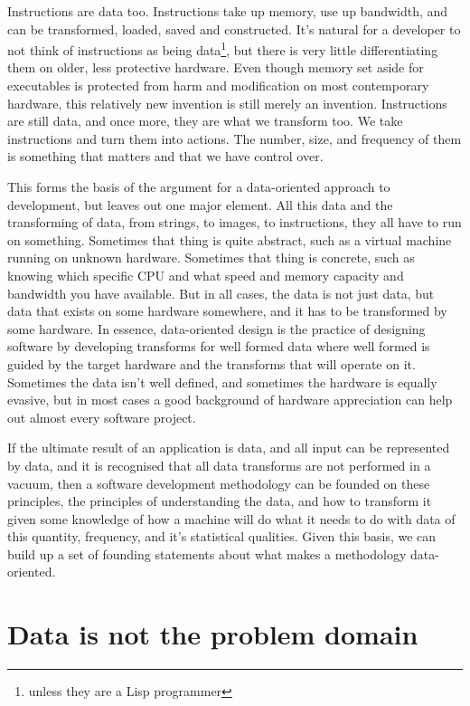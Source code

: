 Instructions are data too. Instructions take up memory, use up bandwidth, and
can be transformed, loaded, saved and constructed. It's natural for a developer
to not think of instructions as being data\footnote{unless they are a Lisp
programmer}, but there is very little differentiating them on older, less
protective hardware.  Even though memory set aside for executables is protected
from harm and modification on most contemporary hardware, this relatively new
invention is still merely an invention. Instructions are still data, and once
more, they are what we transform too. We take instructions and turn them into
actions. The number, size, and frequency of them is something that matters and
that we have control over.

This forms the basis of the argument for a data-oriented approach to
development, but leaves out one major element. All this data and the
transforming of data, from strings, to images, to instructions, they all have
to run on something. Sometimes that thing is quite abstract, such as a virtual
machine running on unknown hardware. Sometimes that thing is concrete, such as
knowing which specific CPU and what speed and memory capacity and bandwidth you
have available. But in all cases, the data is not just data, but data that
exists on some hardware somewhere, and it has to be transformed by some
hardware. In essence, data-oriented design is the practice of designing
software by developing transforms for well formed data where well formed is
guided by the target hardware and the transforms that will operate on it.
Sometimes the data isn't well defined, and sometimes the hardware is equally
evasive, but in most cases a good background of hardware appreciation can help
out almost every software project.

If the ultimate result of an application is data, and all input can be
represented by data, and it is recognised that all data transforms are not
performed in a vacuum, then a software development methodology can be founded
on these principles, the principles of understanding the data, and how to
transform it given some knowledge of how a machine will do what it needs to do
with data of this quantity, frequency, and it's statistical qualities. Given
this basis, we can build up a set of founding statements about what makes a
methodology data-oriented.

\section{Data is not the problem domain}


